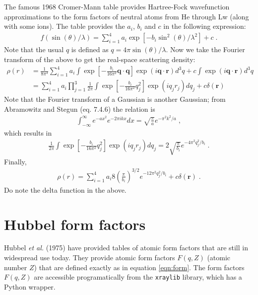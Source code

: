 \documentclass[11pt]{article}
\renewcommand{\vec}[1]{\boldsymbol{#1}}
\begin{document}
The famous 1968 Cromer-Mann \cite{Cromer1968} table provides Hartree-Fock wavefunction approximations to the 
form factors of neutral atoms from He through Lw (along with some ions).  The table provides the $a_i$, $b_i$ and $c$ in the following expression:
\begin{align}
 f(\sin(\theta)/\lambda)=\sum_{i=1}^4 a_i \exp[-b_i \sin^2(\theta)/\lambda^2] + c \;.
\end{align}
Note that the usual $q$ is defined as $q=4\pi \sin(\theta)/\lambda$.  Now we take the Fourier transform
of the above to get the real-space scattering density:
\begin{align}
 \rho(r) &= \frac{1}{8\pi^3} \sum_{i=1}^4 a_i\int   \exp\left[-\frac{b_i}{16\pi^2} \vec{q}\cdot\vec{q}\right]\exp(i\vec{q}\cdot\vec{r})d^3q + c\int \exp(i\vec{q}\cdot\vec{r}) d^3q \\
 &=  \sum_{i=1}^4 a_i \prod_{j=1}^3\frac{1}{2\pi}\int   \exp\left[-\frac{b_i}{16\pi^2} q_j^2\right]\exp(iq_jr_j)dq_j + c\delta(\vec{r})
\end{align}
Note that the Fourier transform of a Gaussian is another Gaussian; from Abramowitz and Stegun \cite{Abramowitz1972} (eq. 7.4.6) the relation is
\begin{align}
 \int_{-\infty}^\infty e^{-ax^2}e^{-2\pi i kx}dx = \sqrt{\frac{\pi}{a}}e^{-\pi^2 k^2/a} \;,
\end{align}
which results in
\begin{align}
 \frac{1}{2\pi}\int   \exp\left[-\frac{b_i}{16\pi^2} q_j^2\right]\exp(iq_jr_j)dq_j = 2\sqrt{\frac{\pi}{b_i}}e^{-4\pi^2 q_j^2/b_i} \;.
\end{align}
Finally, 
\begin{align}
 \rho(r) =  \sum_{i=1}^4 a_i 8\left(\frac{\pi}{b_i}\right)^{3/2}e^{-12\pi^2 q_j^2/b_i} + c\delta(\vec{r}) \;.
\end{align}
Do note the delta function in the above.

\section{Hubbel form factors}

Hubbel {\itshape et al.} (1975)\cite{hubbellAtomicFormFactors1975} have provided tables of atomic form factors that are
still in widespread use today.  They provide atomic form factors $F(q,Z)$ (atomic number $Z$) that are defined exactly
as in equation \ref{eqn:form}.
The form factors $F(q,Z)$ are accessible programatically from the  \texttt{xraylib} library, which has a Python wrapper.
\end{document}

